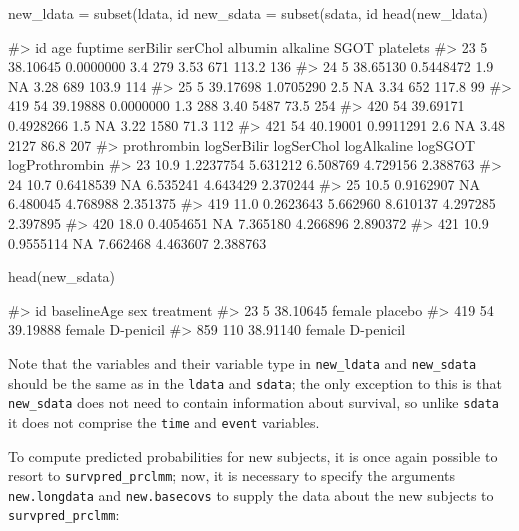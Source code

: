 \begin{Schunk}
\begin{Sinput}
new_ldata = subset(ldata, id %
new_sdata = subset(sdata, id %
head(new_ldata)
\end{Sinput}
\begin{Soutput}
#>     id      age   fuptime serBilir serChol albumin alkaline  SGOT platelets
#> 23   5 38.10645 0.0000000      3.4     279    3.53      671 113.2       136
#> 24   5 38.65130 0.5448472      1.9      NA    3.28      689 103.9       114
#> 25   5 39.17698 1.0705290      2.5      NA    3.34      652 117.8        99
#> 419 54 39.19888 0.0000000      1.3     288    3.40     5487  73.5       254
#> 420 54 39.69171 0.4928266      1.5      NA    3.22     1580  71.3       112
#> 421 54 40.19001 0.9911291      2.6      NA    3.48     2127  86.8       207
#>     prothrombin logSerBilir logSerChol logAlkaline  logSGOT logProthrombin
#> 23         10.9   1.2237754   5.631212    6.508769 4.729156       2.388763
#> 24         10.7   0.6418539         NA    6.535241 4.643429       2.370244
#> 25         10.5   0.9162907         NA    6.480045 4.768988       2.351375
#> 419        11.0   0.2623643   5.662960    8.610137 4.297285       2.397895
#> 420        18.0   0.4054651         NA    7.365180 4.266896       2.890372
#> 421        10.9   0.9555114         NA    7.662468 4.463607       2.388763
\end{Soutput}
\begin{Sinput}
head(new_sdata)
\end{Sinput}
\begin{Soutput}
#>      id baselineAge    sex treatment
#> 23    5    38.10645 female   placebo
#> 419  54    39.19888 female D-penicil
#> 859 110    38.91140 female D-penicil
\end{Soutput}
\end{Schunk}

Note that the variables and their variable type in \texttt{new\_ldata}
and \texttt{new\_sdata} should be the same as in the \texttt{ldata} and
\texttt{sdata}; the only exception to this is that \texttt{new\_sdata}
does not need to contain information about survival, so unlike
\texttt{sdata} it does not comprise the \texttt{time} and \texttt{event}
variables.

To compute predicted probabilities for new subjects, it is once again
possible to resort to \texttt{survpred\_prclmm}; now, it is necessary to
specify the arguments \texttt{new.longdata} and \texttt{new.basecovs} to
supply the data about the new subjects to \texttt{survpred\_prclmm}:

